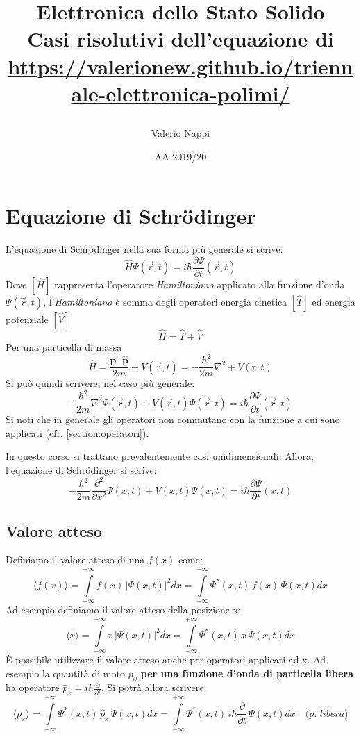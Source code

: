 \documentclass{article}
\title{Elettronica dello Stato Solido\\\large Casi risolutivi dell'equazione di \schr\\
\medskip
\mbox{\url{https://valerionew.github.io/triennale-elettronica-polimi/}}
\author{Valerio Nappi}
\date{AA 2019/20}
}
\newcommand{\schr}{Schr\"odinger }
\newcommand{\ham}{\emph{Hamiltoniano }}
\begin{document}
\maketitle

\tableofcontents
\newpage

\section{Equazione di \schr}
\label{section:intro}

L'equazione di \schr nella sua forma più generale si scrive:
\[\hat H \Psi(\vec{r},t)=i\hbar\frac{\partial \Psi}{\partial t} (\vec{r},t) \]
Dove \([\hat H]\) rappresenta l'operatore \ham applicato alla funzione d'onda \(\Psi(\vec{r},t)\), l'\ham è somma degli operatori energia cinetica \([\hat{T}]\) ed energia potenziale \([\hat{V}]\)
\[ \hat{H} = \hat{T} + \hat{V} \]
Per una particella di massa 
\[ \hat{H}  = \frac{\mathbf{\hat{p}}\cdot\mathbf{\hat{p}}}{2m}+ V(\vec{r},t) = -\frac{\hbar^2}{2m}\nabla^2+ V(\mathbf{r},t)\]
Si può quindi scrivere, nel caso più generale:
\[-\frac{\hbar^2}{2m}\nabla^2\Psi(\vec{r},t) + V(\vec{r},t)\Psi(\vec{r},t)=i\hbar\frac{\partial \Psi}{\partial t} (\vec{r},t) \]
Si noti che in generale gli operatori non commutano con la funzione a cui sono applicati (cfr. \ref{section:operatori}).

In questo corso si trattano prevalentemente casi unidimensionali. Allora, l'equazione di \schr si scrive:
\[-\frac{\hbar^2}{2m}\frac{\partial^2 }{\partial x^2}\Psi(x,t) + V(x,t)\Psi(x,t)=i\hbar\frac{\partial \Psi}{\partial t} (x,t) \]



\subsection{Valore atteso}
Definiamo il valore atteso di una \(f(x)\) come:
\[ \langle f(x) \rangle = \int\limits_{-\infty}^{+\infty}f(x) \, {|\Psi(x,t)|}^2 dx= \int\limits_{-\infty}^{+\infty}\Psi^*(x,t)\,f(x)\,\Psi(x,t) dx\]
Ad esempio definiamo il valore atteso della posizione x:
\[ \langle x \rangle = \int\limits_{-\infty}^{+\infty}x \, {|\Psi(x,t)|}^2 dx= \int\limits_{-\infty}^{+\infty}\Psi^*(x,t)\,x\,\Psi(x,t) dx\]
È possibile utilizzare il valore atteso anche per operatori applicati ad x. Ad esempio la quantità di moto \(p_x\) \textbf{per una funzione d'onda di particella libera} ha operatore \(\hat p_x = i\hbar\frac{\partial}{\partial t}\). Si potrà allora scrivere:
\[ \langle p_x \rangle = \int\limits_{-\infty}^{+\infty}\Psi^*(x,t)\,\hat p_x\,\Psi(x,t) dx = \int\limits_{-\infty}^{+\infty}\Psi^*(x,t)\,i\hbar\frac{\partial}{\partial t}\,\Psi(x,t) dx \quad \textit{(p. libera)} \]
\end{document}
